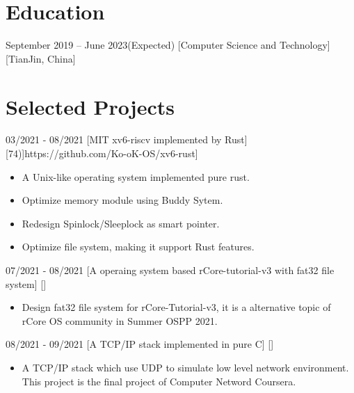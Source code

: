 \documentclass{chicv}
\begin{document}
\begin{basicinfo}
\end{basicinfo}

\section{Education}
  {September 2019 -- June 2023(Expected)}
  [Computer Science and Technology]
  [TianJin, China]



\section{Selected Projects}

  {03/2021 - 08/2021}
  [MIT xv6-riscv implemented by Rust]
  [\iconlink[\faGithub][Ko-oK/xv6-rust(\faIcon[regular]{star}74)]{https://github.com/Ko-oK-OS/xv6-rust}]
  \begin{itemize}
    \item A Unix-like operating system implemented pure rust. 
    \item Optimize memory module using Buddy Sytem.
    \item Redesign Spinlock/Sleeplock as smart pointer.
    \item Optimize file system, making it support Rust features.
  \end{itemize}

  {07/2021 - 08/2021}
  [A operaing system based rCore-tutorial-v3 with fat32 file system]
  []
  \begin{itemize}
    \item Design fat32 file system for rCore-Tutorial-v3, it is a alternative topic of rCore OS community in Summer OSPP 2021.
  \end{itemize}

  {08/2021 - 09/2021}
  [A TCP/IP stack implemented in pure C]
  []
  \begin{itemize}
    \item A TCP/IP stack which use UDP to simulate low level network environment. This project is the final project of Computer Netword Coursera.
  \end{itemize}
\end{document}
